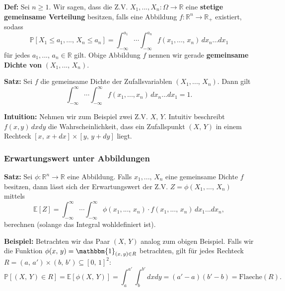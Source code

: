 \documentclass[a4paper]{extarticle}
\begin{document}
\textbf{Def:} Sei $n \geq 1$. Wir sagen, dass die Z.V. $X_1,...,X_n : \Omega \to \mathbb{R}$ eine \textbf{stetige gemeinsame Verteilung} besitzen, falls eine Abbildung $f : \mathbb{R}^n \to \mathbb{R}_+$ existiert, sodass
\[
    \mathbb{P}[X_1 \leq a_1,..., \, X_n \leq a_n] = \int_{- \infty}^{a_1} \cdots \int_{-\infty}^{a_n} f(x_1,..., \, x_n) \, dx_n ... dx_1
\]
für jedes $a_1,..., \, a_n \in \mathbb{R}$ gilt. Obige Abbildung $f$ nennen wir gerade \textbf{gemeinsame Dichte von} $(X_1,..., \, X_n)$.

\begin{cbox}
    \textbf{Satz:} Sei $f$ die gemeinsame Dichte der Zufallsvariablen $(X_1,..., \, X_n)$. Dann gilt
    \[
        \int_{- \infty}^{\infty} \cdots \int_{ - \infty}^{\infty} f(x_1,...,x_n) \, dx_n ... dx_1 = 1.
    \]
\end{cbox}

\begin{ebox}
    \textbf{Intuition:} Nehmen wir zum Beispiel zwei Z.V. $X, \, Y$. Intuitiv beschreibt $f(x,y) \, dxdy$ die Wahrscheinlichkeit, dass ein Zufallspunkt $(X, \, Y)$ in einem Rechteck $[x, \, x + dx] \times [y, \, y + dy]$ liegt.
\end{ebox}

\subsubsection{Erwartungswert unter Abbildungen}

\begin{cbox}
    \textbf{Satz:} Sei $\phi : \mathbb{R}^n \to \mathbb{R}$ eine Abbildung. Falls $x_1,..., \, X_n$ eine gemeinsame Dichte $f$ besitzen, dann lässt sich der Erwartungswert der Z.V. $Z = \phi(X_1,..., \, X_n)$ mittels
    \[
        \mathbb{E}[Z] = \int_{- \infty}^{\infty} \cdots \int_{- \infty}^{\infty} \phi(x_1,..., \, x_n) \cdot f(x_1,..., \, x_n) \, dx_1...dx_n,
    \]
    berechnen (solange das Integral wohldefiniert ist).
\end{cbox}

\begin{ebox}
    \textbf{Beispiel:} Betrachten wir das Paar $(X, \, Y)$ analog zum obigen Beispiel. Falls wir die Funktion $\phi(x, \, y) = \mathbbm{1}_{(x, \, y) \in R}$ betrachten, gilt für jedes Rechteck $R = (a, \, a') \times (b, \, b') \subseteq [0, \, 1]^2$:
    \[
        \mathbb{P}[(X, \, Y) \in R] = \mathbb{E}[\phi(X, \, Y)] = \int_a^{a'} \int_b^{b'} dxdy = (a'-a)(b'-b) = \text{Flaeche}(R).
    \]
\end{ebox}
\end{document}
